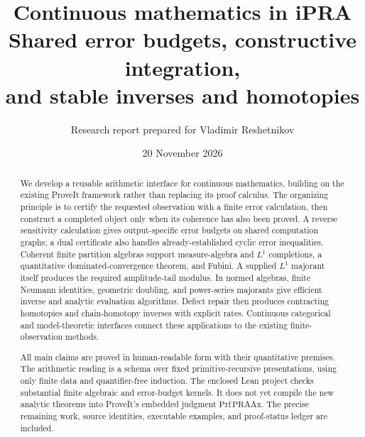 \documentclass[11pt,oneside]{article}
\title{Continuous mathematics in iPRA\\[5pt]\Large Shared error budgets, constructive integration,\\and stable inverses and homotopies}
\author{Research report prepared for Vladimir Reshetnikov}
\date{20 November 2026}
\theoremstyle{definition}
\theoremstyle{remark}
\begin{document}
\maketitle
\begin{abstract}
We develop a reusable arithmetic interface for continuous mathematics, building on the existing ProveIt framework rather than replacing its proof calculus. The organizing principle is to certify the requested observation with a finite error calculation, then construct a completed object only when its coherence has also been proved. A reverse sensitivity calculation gives output-specific error budgets on shared computation graphs; a dual certificate also handles already-established cyclic error inequalities. Coherent finite partition algebras support measure-algebra and $L^1$ completions, a quantitative dominated-convergence theorem, and Fubini. A supplied $L^1$ majorant itself produces the required amplitude-tail modulus. In normed algebras, finite Neumann identities, geometric doubling, and power-series majorants give efficient inverse and analytic evaluation algorithms. Defect repair then produces contracting homotopies and chain-homotopy inverses with explicit rates. Continuous categorical and model-theoretic interfaces connect these applications to the existing finite-observation methods.

All main claims are proved in human-readable form with their quantitative premises. The arithmetic reading is a schema over fixed primitive-recursive presentations, using only finite data and quantifier-free induction. The enclosed Lean project checks substantial finite algebraic and error-budget kernels. It does not yet compile the new analytic theorems into ProveIt's embedded judgment $\mathrm{Prf}\,\mathrm{PRAAx}$. The precise remaining work, source identities, executable examples, and proof-status ledger are included.
\end{abstract}
\tableofcontents
\clearpage









\end{document}
